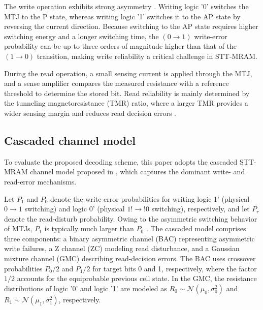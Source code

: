 \documentclass[conference]{IEEEtran}
\begin{document}


The write operation exhibits strong asymmetry \cite{nguyen2021design}. Writing logic '0' switches the MTJ to the P state, whereas writing logic '1' switches it to the AP state by reversing the current direction. Because switching to the AP state requires higher switching energy and a longer switching time, the $(0 \rightarrow 1)$ write-error probability can be up to three orders of magnitude higher than that of the $(1 \rightarrow 0)$ transition, making write reliability a critical challenge in STT-MRAM.

During the read operation, a small sensing current is applied through the MTJ, and a sense amplifier compares the measured resistance with a reference threshold to determine the stored bit. Read reliability is mainly determined by the tunneling magnetoresistance (TMR) ratio, where a larger TMR provides a wider sensing margin and reduces read decision errors \cite{nguyen2021design}.

\subsection{Cascaded channel model}

To evaluate the proposed decoding scheme, this paper adopts the cascaded STT-MRAM channel model proposed in \cite{cai2017cascaded}, which captures the dominant write- and read-error mechanisms.

Let $P_1$ and $P_0$ denote the write-error probabilities for writing logic 1' (physical $0\!\rightarrow\!1$ switching) and logic 0' (physical $1!\rightarrow!0$ switching), respectively, and let $P_r$ denote the read-disturb probability. Owing to the asymmetric switching behavior of MTJs, $P_1$ is typically much larger than $P_0$ \cite{nguyen2021design}. The cascaded model comprises three components: a binary asymmetric channel (BAC) representing asymmetric write failures, a Z channel (ZC) modeling read disturbance, and a Gaussian mixture channel (GMC) describing read-decision errors. The BAC uses crossover probabilities $P_0/2$ and $P_1/2$ for target bits 0 and 1, respectively, where the factor $1/2$ accounts for the equiprobable previous cell state. In the GMC, the resistance distributions of logic '0' and logic '1' are modeled as $R_0\sim\mathcal{N}(\mu_0,\sigma_0^2)$ and $R_1\sim\mathcal{N}(\mu_1,\sigma_1^2)$, respectively.
\end{document}
